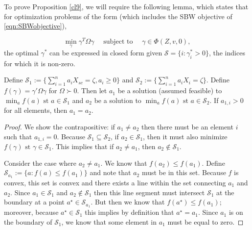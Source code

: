 To prove Proposition \ref{cl9}, we will require the following lemma, which states that for optimization problems of the form (which includes the SBW objective of \eqref{eqn:SBWobjective}),

\[ \min_\gamma \gamma^T \Omega \gamma \quad \text{ subject to } \quad  \gamma \in \Phi(Z, v, 0),\]
the optimal $\gamma^*$ can be expressed in closed form given $\mathcal{S} = \{i: \gamma^*_i > 0\}$, the indices for which it is non-zero.

\begin{lemma}\label{lemma:a1}
    Define $\mathcal{S}_1 := \{\sum_{i=1}^n a_{i}X_{sc} = \zeta, a_{i} \ge 0\}$ and $\mathcal{S}_2 := \{\sum_{i=1}^n a_{i}X_{i} = \zeta\}$. Define $f(\gamma) = \gamma'\Omega\gamma$ for $\Omega \succ 0$. Then let $a_1$ be a solution (assumed feasible) to $\min_a f(a) \text{ st } a \in \mathcal{S}_1$ and $a_2$ be a solution to $\min_a f(a) \text{ st } a \in \mathcal{S}_2$. If $a_{1, i} > 0$ for all elements, then $a_1 = a_2$.
\end{lemma}

\begin{proof}
    We show the contrapositive: if $a_1 \ne a_2$ then there must be an element $i$ such that $a_{1, i} = 0$. Because $\mathcal{S}_1 \subseteq \mathcal{S}_2$, if $a_2 \in \mathcal{S}_1$, then it must also minimize $f(\gamma) \text{ st } \gamma \in \mathcal{S}_1$. This implies that if $a_2 \ne a_1$, then $a_2 \not\in \mathcal{S}_1$.
    
    Consider the case where $a_2 \ne a_1$. We know that $f(a_2) \le f(a_1)$. Define $\mathcal{S}_{a_1} := \{a: f(a) \le f(a_1)\}$ and note that $a_2$ must be in this set. Because $f$ is convex, this set is convex and there exists a line within the set connecting $a_1$ and $a_2$. Since $a_1 \in \mathcal{S}_1$ and $a_2 \not\in\mathcal{S}_1$ then this line segment must intersect $\mathcal{S}_1$ at the boundary at a point $a^\star \in \mathcal{S}_{a_1}$. But then we know that $f(a^\star) \le f(a_1)$; moreover, because $a^\star \in \mathcal{S}_1$ this implies by definition that $a^\star = a_1$. Since $a_1$ is on the boundary of $\mathcal{S}_1$, we know that some element in $a_1$ must be equal to zero. 
\end{proof}


